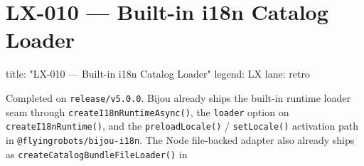 \chapter{LX-010 --- Built-in i18n Catalog Loader}\label{record-358}

\smallskip

\begin{RecordMeta}
title: "LX-010 — Built-in i18n Catalog Loader"
legend: LX
lane: retro

\end{RecordMeta}

Completed on \texttt{r\allowbreak{}e\allowbreak{}l\allowbreak{}e\allowbreak{}a\allowbreak{}s\allowbreak{}e\allowbreak{}/\allowbreak{}v\allowbreak{}5\allowbreak{}.\allowbreak{}0\allowbreak{}.\allowbreak{}0}. Bijou already ships the built-in runtime loader seam through \texttt{c\allowbreak{}r\allowbreak{}e\allowbreak{}a\allowbreak{}t\allowbreak{}e\allowbreak{}I\allowbreak{}1\allowbreak{}8\allowbreak{}n\allowbreak{}R\allowbreak{}u\allowbreak{}n\allowbreak{}t\allowbreak{}i\allowbreak{}m\allowbreak{}e\allowbreak{}A\allowbreak{}s\allowbreak{}y\allowbreak{}n\allowbreak{}c\allowbreak{}(\allowbreak{})}, the \texttt{l\allowbreak{}o\allowbreak{}a\allowbreak{}d\allowbreak{}e\allowbreak{}r} option on \texttt{c\allowbreak{}r\allowbreak{}e\allowbreak{}a\allowbreak{}t\allowbreak{}e\allowbreak{}I\allowbreak{}1\allowbreak{}8\allowbreak{}n\allowbreak{}R\allowbreak{}u\allowbreak{}n\allowbreak{}t\allowbreak{}i\allowbreak{}m\allowbreak{}e\allowbreak{}(\allowbreak{})}, and the \texttt{p\allowbreak{}r\allowbreak{}e\allowbreak{}l\allowbreak{}o\allowbreak{}a\allowbreak{}d\allowbreak{}L\allowbreak{}o\allowbreak{}c\allowbreak{}a\allowbreak{}l\allowbreak{}e\allowbreak{}(\allowbreak{})} / \texttt{s\allowbreak{}e\allowbreak{}t\allowbreak{}L\allowbreak{}o\allowbreak{}c\allowbreak{}a\allowbreak{}l\allowbreak{}e\allowbreak{}(\allowbreak{})} activation path in \texttt{@\allowbreak{}f\allowbreak{}l\allowbreak{}y\allowbreak{}i\allowbreak{}n\allowbreak{}g\allowbreak{}r\allowbreak{}o\allowbreak{}b\allowbreak{}o\allowbreak{}t\allowbreak{}s\allowbreak{}/\allowbreak{}b\allowbreak{}i\allowbreak{}j\allowbreak{}o\allowbreak{}u\allowbreak{}-\allowbreak{}i\allowbreak{}1\allowbreak{}8\allowbreak{}n}. The Node file-backed adapter also already ships as \texttt{c\allowbreak{}r\allowbreak{}e\allowbreak{}a\allowbreak{}t\allowbreak{}e\allowbreak{}C\allowbreak{}a\allowbreak{}t\allowbreak{}a\allowbreak{}l\allowbreak{}o\allowbreak{}g\allowbreak{}B\allowbreak{}u\allowbreak{}n\allowbreak{}d\allowbreak{}l\allowbreak{}e\allowbreak{}F\allowbreak{}i\allowbreak{}l\allowbreak{}e\allowbreak{}L\allowbreak{}o\allowbreak{}a\allowbreak{}d\allowbreak{}e\allowbreak{}r\allowbreak{}(\allowbreak{})} in 